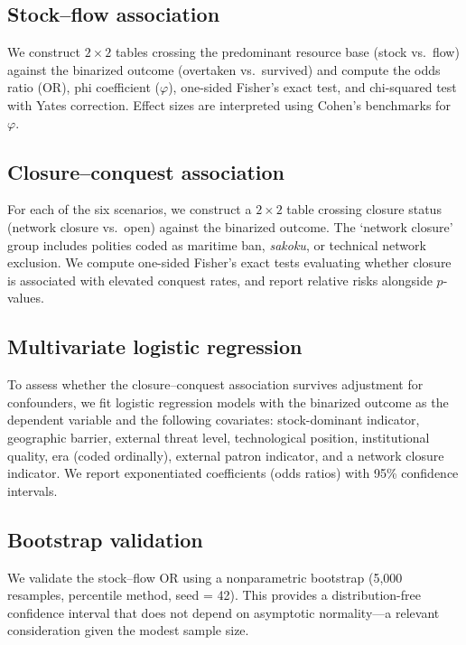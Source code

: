 \documentclass[pdflatex,sn-basic]{sn-jnl}
\theoremstyle{thmstyleone}%
\theoremstyle{thmstyletwo}%
\theoremstyle{thmstylethree}%
\begin{document}
\subsection{Stock--flow association}\label{sec:methods-stockflow}

We construct $2 \times 2$ tables crossing the predominant resource base (stock vs.\ flow) against the binarized outcome (overtaken vs.\ survived) and compute the odds ratio (OR), phi coefficient ($\varphi$), one-sided Fisher's exact test, and chi-squared test with Yates correction. Effect sizes are interpreted using Cohen's benchmarks for $\varphi$.

\subsection{Closure--conquest association}\label{sec:methods-closure}

For each of the six scenarios, we construct a $2 \times 2$ table crossing closure status (network closure vs.\ open) against the binarized outcome. The `network closure' group includes polities coded as maritime ban, \emph{sakoku}, or technical network exclusion. We compute one-sided Fisher's exact tests evaluating whether closure is associated with elevated conquest rates, and report relative risks alongside $p$-values.

\subsection{Multivariate logistic regression}\label{sec:methods-logistic}

To assess whether the closure--conquest association survives adjustment for confounders, we fit logistic regression models with the binarized outcome as the dependent variable and the following covariates: stock-dominant indicator, geographic barrier, external threat level, technological position, institutional quality, era (coded ordinally), external patron indicator, and a network closure indicator. We report exponentiated coefficients (odds ratios) with 95\% confidence intervals.

\subsection{Bootstrap validation}\label{sec:methods-bootstrap}

We validate the stock--flow OR using a nonparametric bootstrap (5{,}000 resamples, percentile method, seed = 42). This provides a distribution-free confidence interval that does not depend on asymptotic normality---a relevant consideration given the modest sample size.
\end{document}
